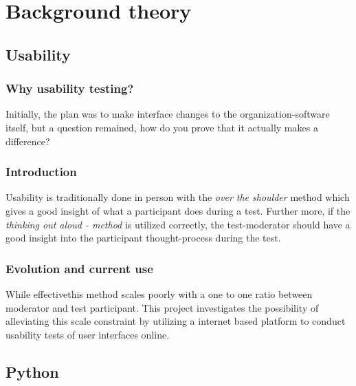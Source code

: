 \documentclass[nofilelist,dvipsnames]{cslthse-msc}
\begin{document}
	\chapter{Background theory}

    \section{Usability}

      \subsection{Why usability testing?}

        Initially, the plan was to make interface changes to the
        organization-software itself, but a question remained, how do you prove
        that it actually makes a difference?


      \subsection{Introduction}

        Usability is traditionally done in person with the \textit{over the
        shoulder} method which gives a good insight of what a participant does
        during a test. Further more, if the \textit{thinking out aloud -
        method} is utilized correctly, the test-moderator should have a good
        insight into the participant thought-process during the test.

      \subsection{Evolution and current use}

        While effective\checkTruth this method scales poorly with a one to one
        ratio between moderator and test participant. This project investigates
        the possibility of alleviating this scale constraint by utilizing a
        internet based platform to conduct usability tests of user interfaces
        online.



    \section{Python}
\end{document}
